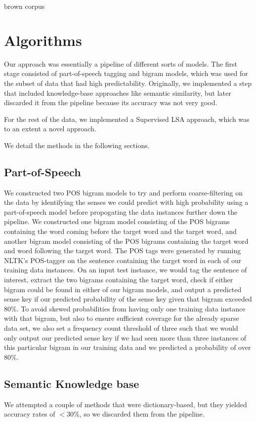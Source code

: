 \documentclass[10pt, letterpaper]{article}
\begin{document}
	brown corpus

	\section{Algorithms}

	 Our approach was essentially a pipeline of different sorts of models. 
	 The first stage consisted of part-of-speech tagging and bigram models, which
	 was used for the subset of data that had high predictability. 
	 Originally, we implemented a step that included knowledge-base approaches like
	 semantic similarity, but later discarded it from the pipeline because its accuracy
	 was not very good. 

	 For the rest of the data, we implemented a Supervised LSA approach, which was to
	 an extent a novel approach. 

	 We detail the methods in the following sections.  
 	\subsection{Part-of-Speech}
 	We constructed two POS bigram models to try and perform coarse-filtering on the data by identifying the senses we could predict with high probability using a part-of-speech model before propogating the data instances further down the pipeline. We constructed one bigram model consisting of the POS bigrams containing the word coming before the target word and the target word, and another bigram model consisting of the POS bigrams containing the target word and word following the target word. The POS tags were generated by running NLTK's POS-tagger on the sentence containing the target word in each of our training data instances. On an input test instance, we would tag the sentence of interest, extract the two bigrams containing the target word, check if either bigram could be found in either of our bigram models, and output a predicted sense key if our predicted probability of the sense key given that bigram exceeded 80\%. To avoid skewed probabilities from having only one training data instance with that bigram, but also to ensure sufficient coverage for the already sparse data set, we also set a frequency count threshold of three such that we would only output our predicted sense key if we had seen more than three instances of this particular bigram in our training data and we predicted a probability of over 80\%.
 	\subsection{Semantic Knowledge base}
        \indent We attempted a couple of methods that were dictionary-based, but they yielded accuracy rates of $ < 30\%$, so we discarded them from the pipeline.
\end{document}
